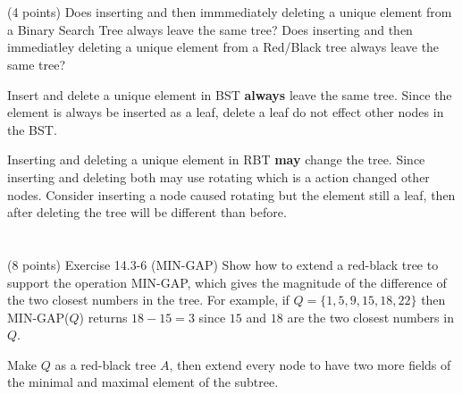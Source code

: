 \documentclass[paper=a4, fontsize=11pt]{scrartcl} %
\begin{document}
\maketitle %

\section{}

\begin{fancyquotes}
  (4 points) Does inserting and then immmediately deleting a unique
  element from a Binary Search Tree always leave the same tree? Does
  inserting and then immediatley deleting a unique element from a
  Red/Black tree always leave the same tree?
\end{fancyquotes}

Insert and delete a unique element in BST \textbf{always} leave the
same tree. Since the element is always be inserted as a leaf, delete a
leaf do not effect other nodes in the BST.

Inserting and deleting a unique element in RBT \textbf{may} change the
tree. Since inserting and deleting both may use rotating which is a
action changed other nodes. Consider inserting a node caused rotating
but the element still a leaf, then after deleting the tree will be
different than before.


\section{}

\begin{fancyquotes}
  (8 points) Exercise 14.3-6 (MIN-GAP) Show how to extend a red-black
  tree to support the operation MIN-GAP, which gives the magnitude of
  the difference of the two closest numbers in the tree. For example,
  if $Q = \{1, 5, 9, 15, 18, 22\}$ then MIN-GAP($Q$) returns $18-15 = 3$
  since $15$ and $18$ are the two closest numbers in $Q$.
\end{fancyquotes}

Make $Q$ as a red-black tree $A$, then extend every node to have two
more fields of the minimal and maximal element of the subtree.
\end{document}
